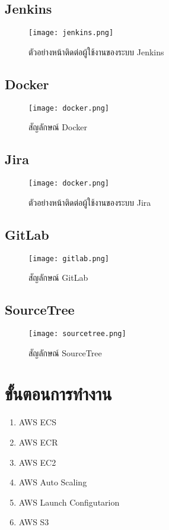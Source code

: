 \newpage
\subsection{Jenkins}
\begin{figure}[ht]
    \centering
    \texttt{[image: jenkins.png]}
    \caption{ตัวอย่างหน้าติดต่อผู้ใช้งานของระบบ Jenkins}
    \label{fig:Jenkins-UI}
\end{figure}

\newpage
\subsection{Docker}
\begin{figure}[ht]
    \centering
    \texttt{[image: docker.png]}
    \caption{สัญลักษณ์ Docker}
    \label{fig:Docker-icon}
\end{figure}

\newpage
\subsection{Jira}
\begin{figure}[ht]
    \centering
    \texttt{[image: docker.png]}
    \caption{ตัวอย่างหน้าติดต่อผู้ใช้งานของระบบ Jira}
    \label{fig:Jira-icon}
\end{figure}

\newpage
\subsection{GitLab}
\begin{figure}[ht]
    \centering
    \texttt{[image: gitlab.png]}
    \caption{สัญลักษณ์ GitLab}
    \label{fig:GitLab-icon}
\end{figure}

\newpage
\subsection{SourceTree}
\begin{figure}[ht]
    \centering
    \texttt{[image: sourcetree.png]}
    \caption{สัญลักษณ์ SourceTree}
    \label{fig:SourceTree-icon}
\end{figure}

\newpage
\section{ขั้นตอนการทำงาน}
\begin{enumerate}
    \item AWS ECS
    \item AWS ECR
    \item AWS EC2
    \item AWS Auto Scaling
    \item AWS Launch Configutarion
    \item AWS S3
\end{enumerate}


